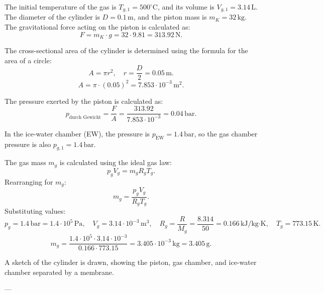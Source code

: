 The initial temperature of the gas is \( T_{g,1} = 500^\circ\text{C} \), and its volume is \( V_{g,1} = 3.14 \, \text{L} \). The diameter of the cylinder is \( D = 0.1 \, \text{m} \), and the piston mass is \( m_K = 32 \, \text{kg} \). The gravitational force acting on the piston is calculated as:  
\[
F = m_K \cdot g = 32 \cdot 9.81 = 313.92 \, \text{N}.
\]  

The cross-sectional area of the cylinder is determined using the formula for the area of a circle:  
\[
A = \pi r^2, \quad r = \frac{D}{2} = 0.05 \, \text{m}.
\]  
\[
A = \pi \cdot (0.05)^2 = 7.853 \cdot 10^{-3} \, \text{m}^2.
\]  

The pressure exerted by the piston is calculated as:  
\[
p_{\text{durch Gewicht}} = \frac{F}{A} = \frac{313.92}{7.853 \cdot 10^{-3}} = 0.04 \, \text{bar}.
\]  

In the ice-water chamber (EW), the pressure is \( p_{\text{EW}} = 1.4 \, \text{bar} \), so the gas chamber pressure is also \( p_{g,1} = 1.4 \, \text{bar} \).  

The gas mass \( m_g \) is calculated using the ideal gas law:  
\[
p_g V_g = m_g R_g T_g.
\]  
Rearranging for \( m_g \):  
\[
m_g = \frac{p_g V_g}{R_g T_g}.
\]  
Substituting values:  
\[
p_g = 1.4 \, \text{bar} = 1.4 \cdot 10^5 \, \text{Pa}, \quad V_g = 3.14 \cdot 10^{-3} \, \text{m}^3, \quad R_g = \frac{R}{M_g} = \frac{8.314}{50} = 0.166 \, \text{kJ/kg·K}, \quad T_g = 773.15 \, \text{K}.
\]  
\[
m_g = \frac{1.4 \cdot 10^5 \cdot 3.14 \cdot 10^{-3}}{0.166 \cdot 773.15} = 3.405 \cdot 10^{-3} \, \text{kg} = 3.405 \, \text{g}.
\]  

A sketch of the cylinder is drawn, showing the piston, gas chamber, and ice-water chamber separated by a membrane.  

---